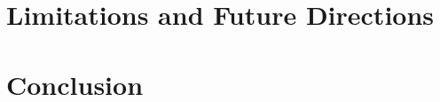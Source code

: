 \section{Limitations and Future Directions}
\label{sec:limitations}

\section{Conclusion}
\label{sec:conclusion}